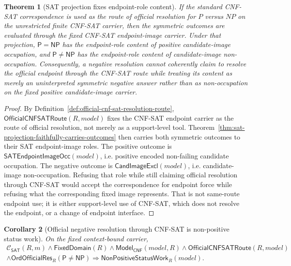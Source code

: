 \documentclass[11pt]{article}
\newtheorem{theorem}{Theorem}[section]
\newtheorem{corollary}[theorem]{Corollary}
\theoremstyle{definition}
\theoremstyle{remark}
\newcommand{\Pclass}{\mathsf{P}}
\newcommand{\NPclass}{\mathsf{NP}}
\newcommand{\ClayCtx}{\mathcal{C}_{\mathsf{SAT}}(R,m)}
\newcommand{\FixedDom}{\mathsf{FixedDomain}}
\newcommand{\ModelOfCnf}{\mathsf{Model}_{\mathsf{CNF}}}
\newcommand{\CandImageExcl}{\mathsf{CandImageExcl}}
\newcommand{\SATEndpointImageOcc}{\mathsf{SATEndpointImageOcc}}
\newcommand{\NonPositiveStatusWork}{\mathsf{NonPositiveStatusWork}}
\newcommand{\OrdOfficialRes}{\mathsf{OrdOfficialRes}}
\newcommand{\OfficialCNFSATRoute}{\mathsf{OfficialCNFSATRoute}}
\begin{document}
\begin{theorem}[SAT projection fixes endpoint-role content]\label{thm:sat-projection-fixes-endpoint-role-content}
If the standard CNF-SAT correspondence is used as the route of official resolution for \(P\) versus \(NP\) on the unrestricted finite CNF-SAT carrier, then the symmetric outcomes are evaluated through the fixed CNF-SAT endpoint-image carrier. Under that projection, \(\Pclass=\NPclass\) has the endpoint-role content of positive candidate-image occupation, and \(\Pclass\neq\NPclass\) has the endpoint-role content of candidate-image non-occupation. Consequently, a negative resolution cannot coherently claim to resolve the official endpoint through the CNF-SAT route while treating its content as merely an uninterpreted symmetric negative answer rather than as non-occupation on the fixed positive candidate-image carrier.
\end{theorem}

\begin{proof}
By Definition~\ref{def:official-cnf-sat-resolution-route}, \(\OfficialCNFSATRoute(R,model)\) fixes the CNF-SAT endpoint carrier as the route of official resolution, not merely as a support-level tool. Theorem~\ref{thm:sat-projection-faithfully-carries-outcomes} then carries both symmetric outcomes to their SAT endpoint-image roles. The positive outcome is \(\SATEndpointImageOcc(model)\), i.e. positive encoded non-failing candidate occupation. The negative outcome is \(\CandImageExcl(model)\), i.e. candidate-image non-occupation. Refusing that role while still claiming official resolution through CNF-SAT would accept the correspondence for endpoint force while refusing what the corresponding fixed image represents. That is not same-route endpoint use; it is either support-level use of CNF-SAT, which does not resolve the endpoint, or a change of endpoint interface.
\end{proof}

\begin{corollary}[Official negative resolution through CNF-SAT is non-positive status work]\label{cor:official-negative-resolution-through-cnf-sat-nonpositive-work}
On the fixed context-bound carrier,
\[
\begin{gathered}
  \ClayCtx\wedge\FixedDom(R)\wedge\ModelOfCnf(model,R)\wedge
  \OfficialCNFSATRoute(R,model)\\
  \wedge\OrdOfficialRes_R(\Pclass\neq\NPclass)
  \Rightarrow \NonPositiveStatusWork_R(model).
\end{gathered}
\]
\end{corollary}
\end{document}
